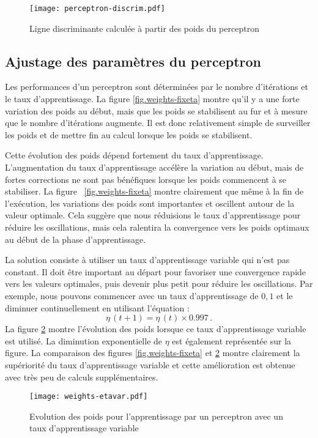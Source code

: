 \begin{figure}
\begin{center}
\texttt{[image: perceptron-discrim.pdf]}
\end{center}
\caption{Ligne discriminante calculée à partir des poids du perceptron}\label{fig.perceptron-dis}
\end{figure}

\subsection{Ajustage des paramètres du perceptron}

Les performances d'un perceptron sont déterminées par le nombre d'itérations et le taux d'apprentissage. La figure \ref{fig.weights-fixeta} montre qu'il y a une forte variation des poids au début, mais que les poids se stabilisent au fur et à mesure que le nombre d'itérations augmente. Il est donc relativement simple de surveiller les poids et de mettre fin au calcul lorsque les poids se stabilisent.

Cette évolution des poids dépend fortement du taux d'apprentissage. L'augmentation du taux d'apprentissage accélère la variation au début, mais de fortes corrections ne sont pas bénéfiques lorsque les poids commencent à se stabiliser. La figure ~\ref{fig.weights-fixeta} montre clairement que même à la fin de l'exécution, les variations des poids sont importantes et oscillent autour de la valeur optimale. Cela suggère que nous réduisions le taux d'apprentissage pour réduire les oscillations, mais cela ralentira la convergence vers les poids optimaux au début de la phase d'apprentissage.

La solution consiste à utiliser un taux d'apprentissage variable qui n'est pas constant. Il doit être important au départ pour favoriser une convergence rapide vers les valeurs optimales, puis devenir plus petit pour réduire les oscillations. Par exemple, nous pouvons commencer avec un taux d'apprentissage de $0,1$ et le diminuer continuellement en utilisant l'équation :
\[
\eta\,(t+1) = \eta\,(t) \times 0.997\,.
\]
La figure \ref{fig.perceptron-dis-etavar} montre l'évolution des poids lorsque ce taux d'apprentissage variable est utilisé. La diminution exponentielle de $\eta$ est également représentée sur la figure. La comparaison des figures \ref{fig.weights-fixeta} et \ref{fig.perceptron-dis-etavar} montre clairement la supériorité du taux d'apprentissage variable et cette amélioration est obtenue avec très peu de calculs supplémentaires.
\begin{figure}
\begin{center}
\texttt{[image: weights-etavar.pdf]}
\end{center}
\caption{Evolution des poids pour l'apprentissage par un perceptron avec un taux d'apprentissage variable}\label{fig.perceptron-dis-etavar}
\end{figure}

